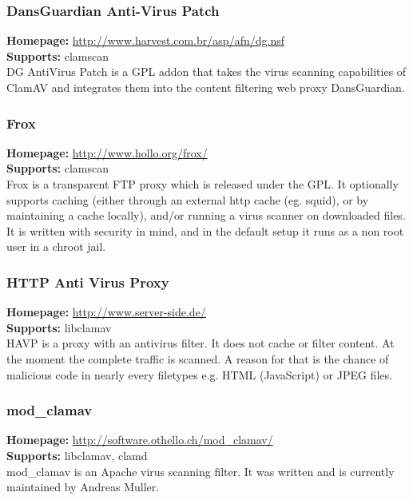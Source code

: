 \documentclass[a4paper,titlepage,12pt]{article}
\begin{document}
    \subsubsection{DansGuardian Anti-Virus Patch}
    \textbf{Homepage:} \url{http://www.harvest.com.br/asp/afn/dg.nsf}\\
    \textbf{Supports:} clamscan\\[4pt]
    DG AntiVirus Patch is a GPL addon that takes the virus scanning
    capabilities of ClamAV and integrates them into the content filtering
    web proxy DansGuardian.

    \subsubsection{Frox}
    \textbf{Homepage:} \url{http://www.hollo.org/frox/}\\
    \textbf{Supports:} clamscan\\[4pt]
    Frox is a transparent FTP proxy which is released under the GPL. It
    optionally supports caching (either through an external http cache
    (eg. squid), or by maintaining a cache locally), and/or running a virus
    scanner on downloaded files. It is written with security in mind, and in
    the default setup it runs as a non root user in a chroot jail.

    \subsubsection{HTTP Anti Virus Proxy}
    \textbf{Homepage:} \url{http://www.server-side.de/}\\
    \textbf{Supports:} libclamav\\[4pt]
    HAVP is a proxy with an antivirus filter. It does not cache or filter
    content. At the moment the complete traffic is scanned. A reason for that
    is the chance of malicious code in nearly every filetypes e.g. HTML
    (JavaScript) or JPEG files.

    \subsubsection{mod\_clamav}
    \textbf{Homepage:} \url{http://software.othello.ch/mod_clamav/}\\
    \textbf{Supports:} libclamav, clamd\\[4pt]
    mod\_clamav is an Apache virus scanning filter. It was written
    and is currently maintained by Andreas Muller.
\end{document}
